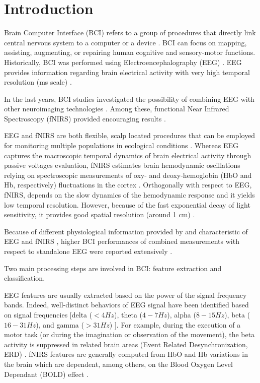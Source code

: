 \documentclass[12pt ]{iopart}
\begin{document}
\section{Introduction}

Brain Computer Interface (BCI) refers to a group of procedures that directly link  central nervous system to a computer or a device \parencite{wolpaw2000brain}. BCI can focus on mapping, assisting, augmenting, or repairing human cognitive and sensory-motor functions. 
Historically, BCI was performed using Electroencephalography (EEG) \parencite{lotte2007review}. EEG  provides information regarding brain electrical activity with very high temporal resolution (ms scale) \parencite{hallez2007review}. 

In the last years, BCI studies investigated the possibility of combining EEG with other neuroimaging technologies \parencite{pfurtscheller2010hybrid}. Among these, functional Near Infrared Spectroscopy (fNIRS) provided encouraging results \parencite{fazli2012enhanced}. 

EEG and fNIRS are both flexible, scalp located procedures that can be employed for monitoring multiple populations in ecological conditions \parencite{farroni2013infant, costantini2013studying, zappasodi2017prognostic, watanabe1999neonatal}. Whereas EEG captures the macroscopic temporal dynamics of brain electrical activity through passive voltages evaluation, fNIRS estimates brain hemodynamic oscillations  relying on spectroscopic measurements of oxy- and deoxy-hemoglobin (HbO and Hb, respectively) fluctuations in the cortex \parencite{villringer1997non, ferrari2012brief}. Orthogonally with respect to EEG, fNIRS, depends on the slow dynamics of the hemodynamic response and it yields low temporal resolution. However, because of the fast exponential decay of light sensitivity, it provides good spatial resolution (around 1 cm) \parencite{chiarelli2016combining, chiarelli2015comparison}. 

Because of different physiological information provided by and characteristic of EEG and fNIRS \parencite{croce2017exploiting}, higher BCI performances  of combined measurements with respect to standalone EEG were reported extensively \parencite{fazli2012enhanced, khan2014decoding, hong2015classification, chiarelliREVdaaggiungere} .

Two main processing steps are involved in BCI:  feature extraction and classification. 

EEG features are usually extracted based on the power of the signal frequency bands. Indeed, well-distinct behaviors of EEG signal have been identified based on signal frequencies [delta ($< 4 Hz$), theta ($4-7 Hz$), alpha ($8-15 Hz$), beta ($16-31 Hz$), and gamma ($> 31 Hz$) \parencite{nuwer1988quantitative}]. For example, during the execution of a motor task (or during the imagination or observation of the movement), the beta activity is suppressed in related brain areas (Event Related Desynchronization, ERD) \parencite{pfurtscheller2001functional, pfurtscheller2006future}.  
fNIRS  features are generally  computed from  HbO and Hb variations in the brain which are dependent, among others, on the  Blood Oxygen Level Dependant (BOLD) effect \parencite{steinbrink2006illuminating, naseer2015fnirs}. 
\end{document}
